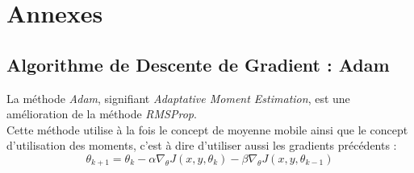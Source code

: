 \documentclass[a4paper, 11pt]{report}
\begin{document}
\chapter*{Annexes}
\section{Algorithme de Descente de Gradient : Adam}
La méthode \emph{Adam}, signifiant \emph{Adaptative Moment Estimation}, est une amélioration de la méthode \emph{RMSProp}.\\
Cette méthode utilise à la fois le concept de moyenne mobile ainsi que le concept d'utilisation des moments, c'est à dire d'utiliser aussi les gradients précédents :
$$\theta_{k+1} = \theta_k - \alpha \nabla_\theta J(x,y,\theta_k) - \beta \nabla_\theta J(x,y,\theta_{k-1})$$
\end{document}
